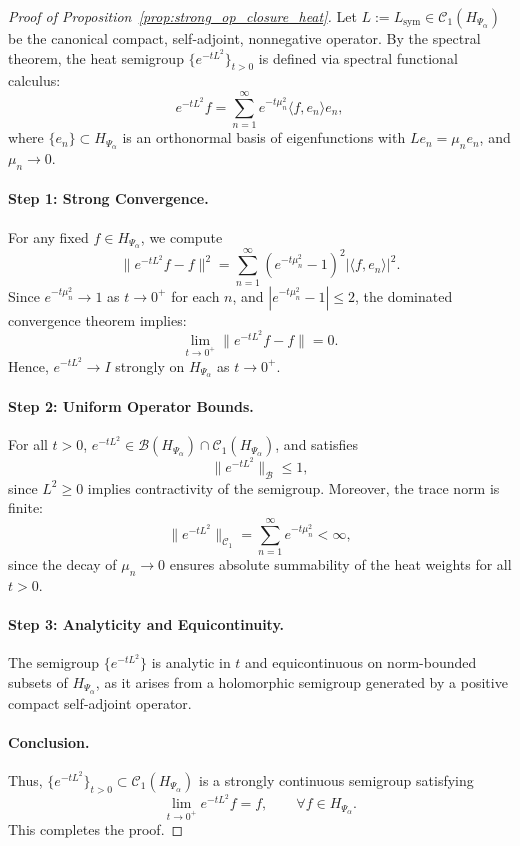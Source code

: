 \begin{proof}[Proof of Proposition~\ref{prop:strong_op_closure_heat}]
Let \( L := L_{\mathrm{sym}} \in \mathcal{C}_1(H_{\Psi_\alpha}) \) be the canonical compact, self-adjoint, nonnegative operator. By the spectral theorem, the heat semigroup \( \{ e^{-tL^2} \}_{t > 0} \) is defined via spectral functional calculus:
\[
e^{-tL^2} f = \sum_{n=1}^\infty e^{-t \mu_n^2} \langle f, e_n \rangle e_n,
\]
where \( \{e_n\} \subset H_{\Psi_\alpha} \) is an orthonormal basis of eigenfunctions with \( L e_n = \mu_n e_n \), and \( \mu_n \to 0 \).

\paragraph{Step 1: Strong Convergence.}
For any fixed \( f \in H_{\Psi_\alpha} \), we compute
\[
\| e^{-t L^2} f - f \|^2 = \sum_{n=1}^\infty \left( e^{-t \mu_n^2} - 1 \right)^2 |\langle f, e_n \rangle|^2.
\]
Since \( e^{-t \mu_n^2} \to 1 \) as \( t \to 0^+ \) for each \( n \), and \( \left| e^{-t \mu_n^2} - 1 \right| \le 2 \), the dominated convergence theorem implies:
\[
\lim_{t \to 0^+} \| e^{-t L^2} f - f \| = 0.
\]
Hence, \( e^{-tL^2} \to I \) strongly on \( H_{\Psi_\alpha} \) as \( t \to 0^+ \).

\paragraph{Step 2: Uniform Operator Bounds.}
For all \( t > 0 \), \( e^{-t L^2} \in \mathcal{B}(H_{\Psi_\alpha}) \cap \mathcal{C}_1(H_{\Psi_\alpha}) \), and satisfies
\[
\| e^{-t L^2} \|_{\mathcal{B}} \le 1,
\]
since \( L^2 \ge 0 \) implies contractivity of the semigroup. Moreover, the trace norm is finite:
\[
\| e^{-t L^2} \|_{\mathcal{C}_1} = \sum_{n=1}^\infty e^{-t \mu_n^2} < \infty,
\]
since the decay of \( \mu_n \to 0 \) ensures absolute summability of the heat weights for all \( t > 0 \).

\paragraph{Step 3: Analyticity and Equicontinuity.}
The semigroup \( \{ e^{-t L^2} \} \) is analytic in \( t \) and equicontinuous on norm-bounded subsets of \( H_{\Psi_\alpha} \), as it arises from a holomorphic semigroup generated by a positive compact self-adjoint operator.

\paragraph{Conclusion.}
Thus, \( \{ e^{-t L^2} \}_{t > 0} \subset \mathcal{C}_1(H_{\Psi_\alpha}) \) is a strongly continuous semigroup satisfying
\[
\lim_{t \to 0^+} e^{-t L^2} f = f, \qquad \forall f \in H_{\Psi_\alpha}.
\]
This completes the proof.
\end{proof}
